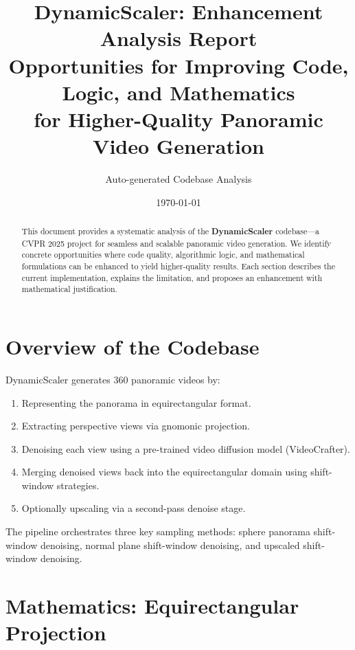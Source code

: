 \documentclass[11pt,a4paper]{article}
\title{
    \textbf{DynamicScaler: Enhancement Analysis Report} \\[6pt]
    \large Opportunities for Improving Code, Logic, and Mathematics \\
    for Higher-Quality Panoramic Video Generation
}
\author{Auto-generated Codebase Analysis}
\date{\today}
\begin{document}
\maketitle

\begin{abstract}
This document provides a systematic analysis of the \textbf{DynamicScaler} codebase---a CVPR 2025 project for seamless and scalable panoramic video generation.
We identify concrete opportunities where code quality, algorithmic logic, and mathematical formulations can be enhanced to yield higher-quality results.
Each section describes the current implementation, explains the limitation, and proposes an enhancement with mathematical justification.
\end{abstract}

\tableofcontents
\newpage

\section{Overview of the Codebase}

DynamicScaler generates 360\textdegree{} panoramic videos by:
\begin{enumerate}
    \item Representing the panorama in equirectangular format.
    \item Extracting perspective views via gnomonic projection.
    \item Denoising each view using a pre-trained video diffusion model (VideoCrafter).
    \item Merging denoised views back into the equirectangular domain using shift-window strategies.
    \item Optionally upscaling via a second-pass denoise stage.
\end{enumerate}

The pipeline orchestrates three key sampling methods: sphere panorama shift-window denoising, normal plane shift-window denoising, and upscaled shift-window denoising.

\section{Mathematics: Equirectangular Projection}
\end{document}
